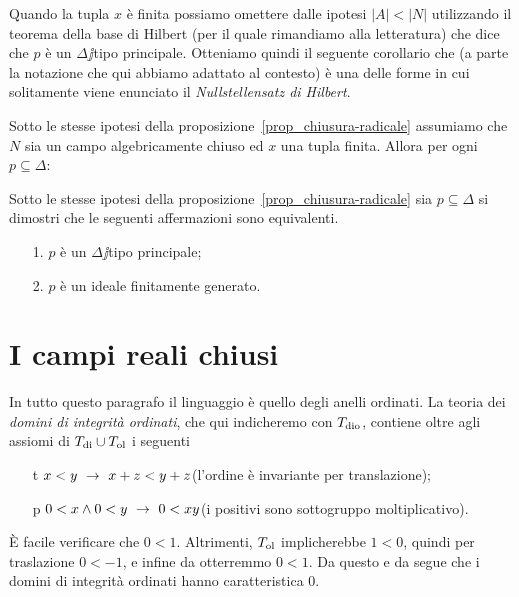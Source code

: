 Quando la tupla $x$ \`e finita possiamo omettere dalle ipotesi $|A|<|N|$ utilizzando il teorema della base di Hilbert (per il quale rimandiamo alla letteratura) che dice che $p$ \`e un $\Delta\jj$tipo principale. Otteniamo quindi il seguente corollario che (a parte la notazione che qui abbiamo adattato al contesto) \`e una delle forme in cui solitamente viene enunciato il \emph{Nullstellensatz di Hilbert}.

\begin{corollary}
Sotto le stesse ipotesi della proposizione~\ref{prop_chiusura-radicale} assumiamo che $N$ sia un campo algebricamente chiuso ed $x$ una tupla finita. Allora per ogni $p\subseteq\Delta$:

\QED

\end{corollary}

\begin{exercise}
Sotto le stesse ipotesi della proposizione~\ref{prop_chiusura-radicale} sia $p\subseteq\Delta$ si dimostri che le seguenti affermazioni sono equivalenti.
\begin{itemize}
\item[1.] $p$ \`e un $\Delta\jj$tipo principale;
\item[2.] $p$ \`e un ideale finitamente generato.
\end{itemize}
\end{exercise}

\section{I campi reali chiusi}


\lavori

In tutto questo paragrafo il linguaggio \`e quello degli anelli ordinati. La teoria dei \emph{domini di integrit\`a ordinati}, che qui indicheremo con \emph{$T_{\rm dio}$}, contiene oltre agli assiomi di $T_{\rm di}\cup T_{\rm ol}$ i seguenti
\begin{itemize}
\item[t] $x<y\ \rightarrow\ x+z<y+z$\hfill (l'ordine \`e invariante per translazione);

\item[p] $0<x\wedge 0<y\ \rightarrow\ 0<xy$\hfill(i positivi sono sottogruppo moltiplicativo).

\end{itemize}
\`E facile verificare che $0<1$. Altrimenti, $T_{\rm ol}$ implicherebbe $1<0$, quindi per traslazione $0<-1$, e infine da  otterremmo $0<1$. Da questo e da  segue che i domini di integrit\`a ordinati hanno caratteristica $0$. 

